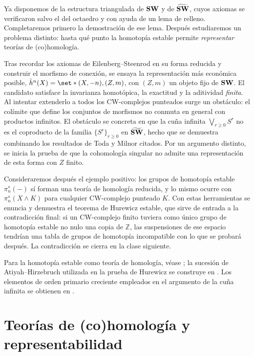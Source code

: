 Ya disponemos de la estructura triangulada de $\mathbf{SW}$ y de $\widetilde{\mathbf{SW}}$, cuyos axiomas se verificaron salvo el del octaedro y con ayuda de un lema de relleno. Completaremos primero la demostración de ese lema. Después estudiaremos un problema distinto: hasta qué punto la homotopía estable permite \emph{representar} teorías de (co)homología.

Tras recordar los axiomas de Eilenberg--Steenrod en su forma reducida y construir el morfismo de conexión, se ensaya la representación más económica posible, $\tilde h^n(X)=\set*{(X,-n),(Z,m)}$, con $(Z,m)$ un objeto fijo de $\mathbf{SW}$. El candidato satisface la invarianza homotópica, la exactitud y la aditividad \emph{finita}. Al intentar extenderlo a todos los CW-complejos punteados surge un obstáculo: el colímite que define los conjuntos de morfismos no conmuta en general con productos infinitos. El obstáculo se concreta en que la cuña infinita $\bigvee_{r\ge0}S^r$ no es el coproducto de la familia $\{S^r\}_{r\ge0}$ en $\widetilde{\mathbf{SW}}$, hecho que se demuestra combinando los resultados de Toda y Milnor citados. Por un argumento distinto, se inicia la prueba de que la cohomología singular no admite una representación de esta forma con $Z$ finito.

Consideraremos después el ejemplo positivo: los grupos de homotopía estable $\pi_n^s(-)$ sí forman una teoría de homología reducida, y lo mismo ocurre con $\pi_n^s(X\wedge K)$ para cualquier CW-complejo punteado $K$. Con estas herramientas se enuncia y demuestra el teorema de Hurewicz estable, que sirve de entrada a la contradicción final: si un CW-complejo finito tuviera como único grupo de homotopía estable no nulo una copia de $\mathbb Z$, las suspensiones de ese espacio tendrían una tabla de grupos de homotopía incompatible con lo que se probará después. La contradicción se cierra en la clase siguiente.

Para la homotopía estable como teoría de homología, véase \cite[\S2.5.1, proposición~2.5.1.7]{malkiewich}; la sucesión de Atiyah--Hirzebruch utilizada en la prueba de Hurewicz se construye en \cite[parte~III, \S7]{adams1974}. Los elementos de orden primario creciente empleados en el argumento de la cuña infinita se obtienen en \cite[teorema~2 y su demostración, pp.~79--82]{milnor1958}.

\section{Teorías de (co)homología y representabilidad}

